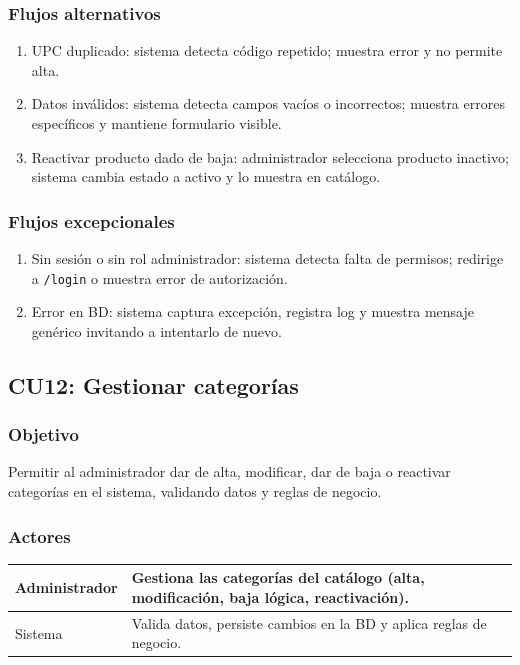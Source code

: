 \documentclass[12pt,a4paper]{article}
\begin{document}
\subsubsection*{Flujos alternativos}
\begin{enumerate}[label=FA-\arabic*]
    \item UPC duplicado: sistema detecta código repetido; muestra error y no permite alta.
    \item Datos inválidos: sistema detecta campos vacíos o incorrectos; muestra errores específicos y mantiene formulario visible.
    \item Reactivar producto dado de baja: administrador selecciona producto inactivo; sistema cambia estado a activo y lo muestra en catálogo.
\end{enumerate}

\subsubsection*{Flujos excepcionales}
\begin{enumerate}[label=FE-\arabic*]
    \item Sin sesión o sin rol administrador: sistema detecta falta de permisos; redirige a \texttt{/login} o muestra error de autorización.
    \item Error en BD: sistema captura excepción, registra log y muestra mensaje genérico invitando a intentarlo de nuevo.
\end{enumerate}


\subsection{CU12: Gestionar categorías}
\subsubsection*{Objetivo}
Permitir al administrador dar de alta, modificar, dar de baja o reactivar categorías en el sistema, validando datos y reglas de negocio.

\subsubsection*{Actores}
\begin{longtable}{|l|p{10cm}|}
    \hline
    Administrador & Gestiona las categorías del catálogo (alta, modificación, baja lógica, reactivación). \\ \hline
    Sistema       & Valida datos, persiste cambios en la BD y aplica reglas de negocio.                   \\ \hline
\end{longtable}
\end{document}
